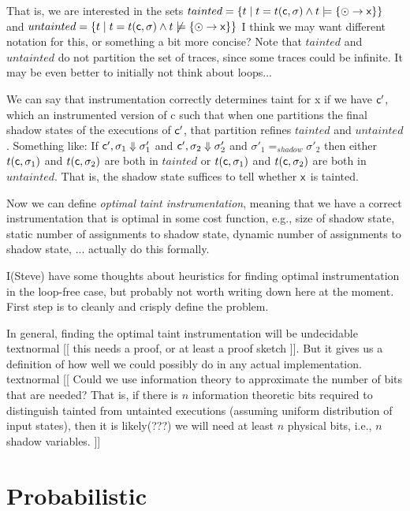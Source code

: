 \documentclass[]{article}
\newcommand{\todo}[1]{textnormal{{\color{black} [[ #1 ]]}}}
\begin{document}
{That is, we are interested in the sets $tainted = \{ t \mid t =
t({\sf c},\sigma) \land t \models \{ \odot \rightarrow {\sf x} \} \}$ and
$untainted = \{ t \mid
t = t({\sf c},\sigma) \land t \not\models \{ \odot \rightarrow {\sf x} \} \}$
I think we may want different notation for this, or something a bit more
concise?
Note that $tainted$ and $untainted$ do not partition the set of
traces, since some traces could be infinite. It may be even better to initially not think about loops...

We can say that instrumentation correctly determines taint for {\sf x}
if we have ${\sf c}'$, which an instrumented version of {\sf c} such
that when one partitions the final shadow states of the executions of
${\sf c}'$, that partition refines $tainted$ and
$untainted$. Something like:
If ${\sf c}', \sigma_1 \Downarrow \sigma'_1$ and ${\sf c}', \sigma_2
\Downarrow \sigma'_2$ and $\sigma'_1 =_\mathit{shadow} \sigma'_2$ then
either $t({\sf c},\sigma_1)$ and $t({\sf c},\sigma_2)$ are both in $tainted$ or 
$t({\sf c},\sigma_1)$ and $t({\sf c},\sigma_2)$ are both in $untainted$. That is, the shadow
state suffices to tell whether $\sf x$ is tainted.

Now we can define \emph{optimal taint instrumentation}, meaning that
we have a correct instrumentation that is optimal in some cost
function, e.g., size of shadow state, static number of assignments to
shadow state, dynamic number of assignments to shadow state,
... actually do this formally.

I(Steve) have some thoughts about heuristics for finding optimal
instrumentation in the loop-free case, but probably not worth writing
down here at the moment. First step is to cleanly and crisply define
the problem.

In general, finding the optimal taint instrumentation will be
undecidable \todo{this needs a proof, or at least a proof sketch}. But
it gives us a definition of how well we could possibly do in any
actual implementation. \todo{Could we use information theory to
  approximate the number of bits that are needed? That is, if there is
$n$ information theoretic bits required to distinguish tainted from
untainted executions (assuming uniform distribution of input states), then it is likely(???) we will need at least $n$ physical bits, i.e., $n$
shadow variables.}


\section{Probabilistic}

}
\end{document}
